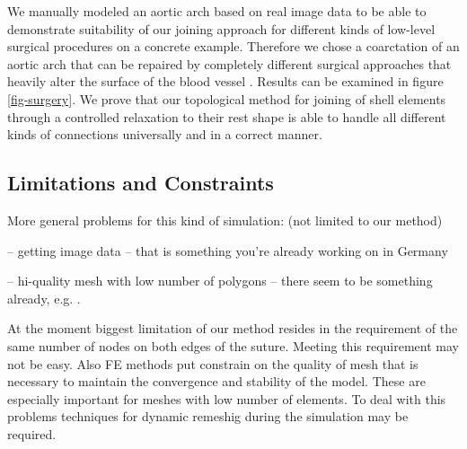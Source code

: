 We manually modeled an aortic arch based on real image data to be able to demonstrate suitability of our joining approach for different kinds of low-level surgical procedures on a concrete example. Therefore we chose a coarctation of an aortic arch that can be repaired by completely different surgical approaches that heavily alter the surface of the blood vessel \cite{Dodge2000}. Results can be examined in figure \ref{fig-surgery}. We prove that our topological method for joining of shell elements through a controlled relaxation to their rest shape is able to handle all different kinds of connections universally and in a correct manner.

\subsection{Limitations and Constraints}

More general problems for this kind of simulation: (not limited to our method)

-- getting image data -- that is something you're already working on in Germany

-- hi-quality mesh with low number of polygons -- there seem to be something already, e.g. \cite{Comas2010c}.

At the moment biggest limitation of our method resides in the requirement of the same number of nodes on both edges of the suture.
Meeting this requirement may not be easy.
Also FE methods put constrain on the quality of mesh that is necessary to maintain the convergence and stability of the model.
These are especially important for meshes with low number of elements.
To deal with this problems techniques for dynamic remeshig during the simulation may be required.


